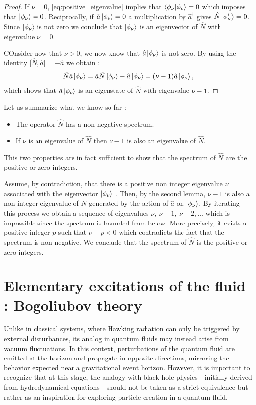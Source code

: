 \begin{proof}
    If $\nu=0$, \autoref{eq:positive_eigenvalue} implies that $\bra{\phi_\nu}\ket{\phi_\nu}=0$ which imposes that $\ket{\phi_\nu}=0$.
    Reciprocally, if $\hat{a}\ket{\phi_\nu}=0$ a multiplication by $\hat{a}^\dagger$ gives $\hat{N}\ket{\phi^i_\nu}=0$. Since $\ket{\phi_\nu}$ is not zero we conclude
    that $\ket{\phi_\nu}$ is an eigenvector of $\hat{N}$ with eigenvalue $\nu =0$.

    COnsider now that $\nu>0$, we now know that $\hat{a}\ket{\phi_\nu}$ is not zero. By using the identity $\bigl[\hat{N},\hat{a}\bigr] = -\hat{a}$ we 
    obtain :
    \begin{equation}
        \hat{N}\hat{a}\ket{\phi_\nu}=\hat{a}\hat{N}\ket{\phi_\nu}-\hat{a}\ket{\phi_\nu}=(\nu-1)\hat{a}\ket{\phi_\nu},
    \end{equation}
    which shows that $\hat{a}\ket{\phi_\nu}$ is an eigenstate of $\hat{N}$ with eigenvalue $\nu-1$.
\end{proof}

\noindent Let us summarize what we know so far :
\begin{itemize}
    \item The operator $\hat{N}$ has a non negative spectrum. 
    \item If $\nu$ is an eigenvalue of $\hat{N}$ then $\nu-1$ is also an eigenvalue of $\hat{N}$.
\end{itemize}

This two properties are in fact sufficient to show that the spectrum of $\hat{N}$ are the positive or zero integers. \\
\bigskip 

Assume, by contradiction, that there is a positive non integer eigenvalue $\nu$ associated with the eigenvector $\ket{\phi_\nu}$ . Then, by the second lemma, $\nu-1$ is also a non integer eigenvalue of $\hat{N}$ generated by 
the action of $\hat{a}$ on $\ket{\phi_\nu}$. By iterating this process we obtain a sequence of eigenvalues $\nu,\ \nu-1,\ \nu-2,\dots$ which is impossible since the spectrum is bounded from below. More precisely, it exists
a positive integer $p$ such that $\nu-p<0$ which contradicts the fact that the spectrum is non negative. We conclude that the spectrum of $\hat{N}$ is the positive or zero integers.




\section{Elementary excitations of the fluid : Bogoliubov theory}
Unlike in classical systems, where Hawking radiation can only be triggered by external disturbances, its analog in quantum fluids may instead arise from vacuum fluctuations. In this context, perturbations of the quantum fluid are emitted at the horizon and propagate in opposite directions, mirroring the behavior expected near a gravitational event horizon. 
However, it is important to recognize that at this stage, the analogy with black hole physics—initially derived from hydrodynamical equations—should not be taken as a strict equivalence but rather as an inspiration for exploring particle creation in a quantum fluid.

